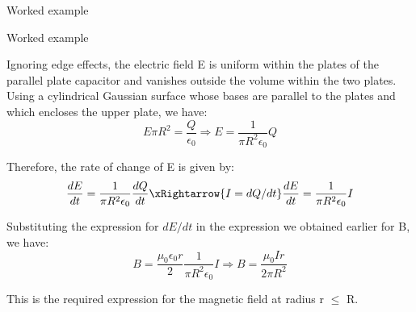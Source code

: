 {\begin{frame}{Worked example }
\end{frame}

%
%
%

\begin{frame}{Worked example }

Ignoring edge effects,
the electric field E is uniform within the plates of the parallel plate capacitor
and vanishes outside the volume within the two plates.
Using a cylindrical Gaussian surface whose bases are parallel to the
plates and which encloses the upper plate, we have:
\begin{equation*}
    E \pi R^2 = \frac{Q}{\epsilon_0} \Rightarrow
    E = \frac{1}{\pi R^2 \epsilon_0} Q
\end{equation*}

Therefore, the rate of change of E is given by:
\begin{equation*}
    \frac{dE}{dt} = \frac{1}{\pi R^2 \epsilon_0} \frac{dQ}{dt}
    \xRightarrow {I = dQ/dt}
    \frac{dE}{dt} = \frac{1}{\pi R^2 \epsilon_0} I
\end{equation*}

Substituting the expression for $dE/dt$ in the expression we obtained
earlier for B, we have:
\begin{equation*}
    B = \frac{\mu_0 \epsilon_0 r}{2} \frac{1}{\pi R^2 \epsilon_0} I
    \Rightarrow
    B = \frac{\mu_0 I r}{2 \pi R^2}
\end{equation*}

This is the required expression for the magnetic field at radius r $\le$ R.

\end{frame}



} %



%
%

\renewcommand{\lecturesummarytitle}{Main points to remember }


%
%

